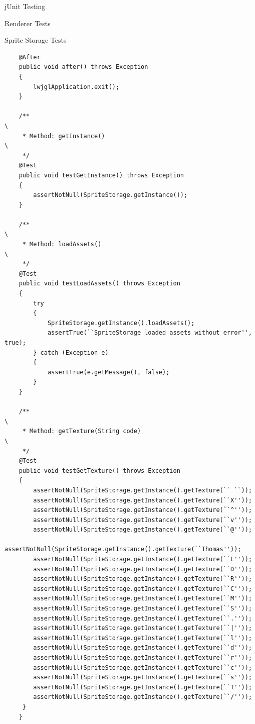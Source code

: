 \documentclass[12pt]{report}
\begin{document}
\begin{chapter}{jUnit Testing}
\begin{section}{Renderer Tests}
\begin{subsection}{Sprite Storage Tests}
\begin{lstlisting}
    @After
    public void after() throws Exception
    {
        lwjglApplication.exit();
    }

    /**                                                                                  \
     * Method: getInstance()                                                             \
     */
    @Test
    public void testGetInstance() throws Exception
    {
        assertNotNull(SpriteStorage.getInstance());
    }

    /**                                                                                  \
     * Method: loadAssets()                                                              \
     */
    @Test
    public void testLoadAssets() throws Exception
    {
        try
        {
            SpriteStorage.getInstance().loadAssets();
            assertTrue(``SpriteStorage loaded assets without error'', true);
        } catch (Exception e)
        {
            assertTrue(e.getMessage(), false);
        }
    }

    /**                                                                                  \  
     * Method: getTexture(String code)                                                   \
     */
    @Test
    public void testGetTexture() throws Exception
    {
        assertNotNull(SpriteStorage.getInstance().getTexture(`` ``));                     
        assertNotNull(SpriteStorage.getInstance().getTexture(``X''));
        assertNotNull(SpriteStorage.getInstance().getTexture(``^''));
        assertNotNull(SpriteStorage.getInstance().getTexture(``v''));
        assertNotNull(SpriteStorage.getInstance().getTexture(``@''));
        assertNotNull(SpriteStorage.getInstance().getTexture(``Thomas''));
        assertNotNull(SpriteStorage.getInstance().getTexture(``L''));
        assertNotNull(SpriteStorage.getInstance().getTexture(``D''));
        assertNotNull(SpriteStorage.getInstance().getTexture(``R''));
        assertNotNull(SpriteStorage.getInstance().getTexture(``C''));
        assertNotNull(SpriteStorage.getInstance().getTexture(``M''));
        assertNotNull(SpriteStorage.getInstance().getTexture(``S''));
        assertNotNull(SpriteStorage.getInstance().getTexture(``.''));
        assertNotNull(SpriteStorage.getInstance().getTexture(``|''));
        assertNotNull(SpriteStorage.getInstance().getTexture(``l''));
        assertNotNull(SpriteStorage.getInstance().getTexture(``d''));
        assertNotNull(SpriteStorage.getInstance().getTexture(``r''));
        assertNotNull(SpriteStorage.getInstance().getTexture(``c''));
        assertNotNull(SpriteStorage.getInstance().getTexture(``s''));
        assertNotNull(SpriteStorage.getInstance().getTexture(``T''));
        assertNotNull(SpriteStorage.getInstance().getTexture(``/''));
     }
    }


\end{lstlisting}
\end{subsection}
\end{section}
\end{chapter}
\end{document}
